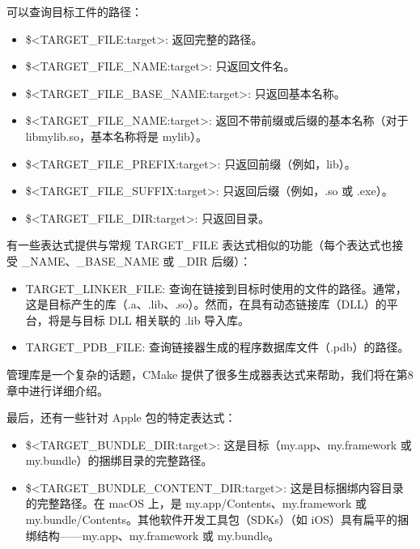可以查询目标工件的路径：

\begin{itemize}
\item
\$<TARGET\_FILE:target>: 返回完整的路径。

\item
\$<TARGET\_FILE\_NAME:target>: 只返回文件名。

\item
\$<TARGET\_FILE\_BASE\_NAME:target>: 只返回基本名称。

\item
\$<TARGET\_FILE\_NAME:target>: 返回不带前缀或后缀的基本名称（对于 libmylib.so，基本名称将是 mylib）。

\item
\$<TARGET\_FILE\_PREFIX:target>: 只返回前缀（例如，lib）。

\item
\$<TARGET\_FILE\_SUFFIX:target>: 只返回后缀（例如，.so 或 .exe）。

\item
\$<TARGET\_FILE\_DIR:target>: 只返回目录。
\end{itemize}

有一些表达式提供与常规 TARGET\_FILE 表达式相似的功能（每个表达式也接受 \_NAME、\_BASE\_NAME 或 \_DIR 后缀）：

\begin{itemize}
\item
TARGET\_LINKER\_FILE: 查询在链接到目标时使用的文件的路径。通常，这是目标产生的库（.a、.lib、.so）。然而，在具有动态链接库（DLL）的平台，将是与目标 DLL 相关联的 .lib 导入库。

\item
TARGET\_PDB\_FILE: 查询链接器生成的程序数据库文件（.pdb）的路径。
\end{itemize}

管理库是一个复杂的话题，CMake 提供了很多生成器表达式来帮助，我们将在第8章中进行详细介绍。

最后，还有一些针对 Apple 包的特定表达式：

\begin{itemize}
\item
\$<TARGET\_BUNDLE\_DIR:target>: 这是目标（my.app、my.framework 或 my.bundle）的捆绑目录的完整路径。

\item
\$<TARGET\_BUNDLE\_CONTENT\_DIR:target>: 这是目标捆绑内容目录的完整路径。在 macOS 上，是 my.app/Contents、my.framework 或 my.bundle/Contents。其他软件开发工具包（SDKs）（如 iOS）具有扁平的捆绑结构——my.app、my.framework 或 my.bundle。
\end{itemize}

